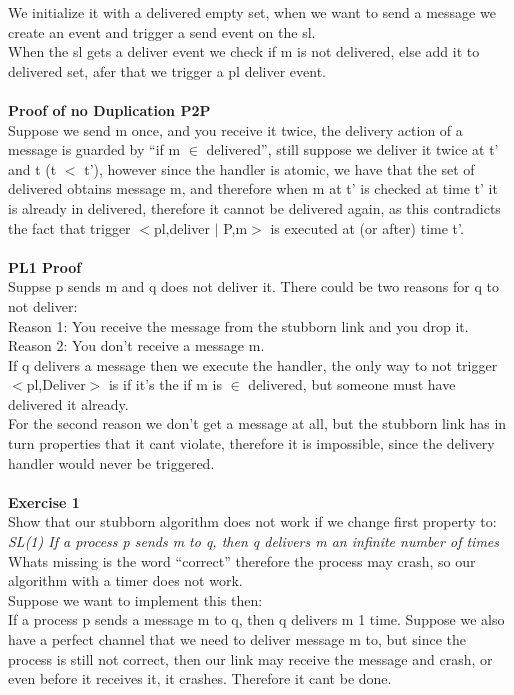 \documentclass[11pt, a4paper]{article}
\begin{document}
We initialize it with a delivered empty set, when we want to send a message we create an event and trigger a send event on the sl.\\
When the sl gets a deliver event we check if m is not delivered, else add it to delivered set, afer that we trigger a pl deliver event.\\\\
\textbf{Proof of no Duplication P2P}\\
Suppose we send m once, and you receive it twice, the delivery action of a message is guarded by “if m $\in$ delivered”, still suppose we deliver it twice at t' and t (t $<$ t'), however since the handler is atomic, we have that the set of delivered obtains message m, and therefore when m at t' is checked at time t' it is already in delivered, therefore it cannot be delivered again, as this contradicts the fact that trigger $<$pl,deliver $|$ P,m$>$ is executed at (or after) time t'.
\\\\
\textbf{PL1 Proof}\\
Suppse p sends m and q does not deliver it. There could be two reasons for q to not deliver:\\
Reason 1: You receive the message from the stubborn link and you drop it.\\
Reason 2: You don't receive a message m.\\
If q delivers a message then we execute the handler, the only way to not trigger $<$pl,Deliver$>$ is if it's the if m is $\in$ delivered, but someone must have delivered it already.\\
For the second reason we don't get a message at all, but the stubborn link has in turn properties that it cant violate, therefore it is impossible, since the delivery handler would never be triggered.\\\\
\textbf{Exercise 1}\\
Show that our stubborn algorithm does not work if we change first property to:\\
\textit{SL(1) If a process p sends m to q, then q delivers m an infinite number of times}\\
Whats missing is the word “correct” therefore the process may crash, so our algorithm with a timer does not work.\\
Suppose we want to implement this then:\\
If a process p sends a message m to q, then q delivers m 1 time. Suppose we also have a perfect channel that we need to deliver message m to, but since the process is still not correct, then our link may receive the message and crash, or even before it receives it, it crashes. Therefore it cant be done.
\end{document}
